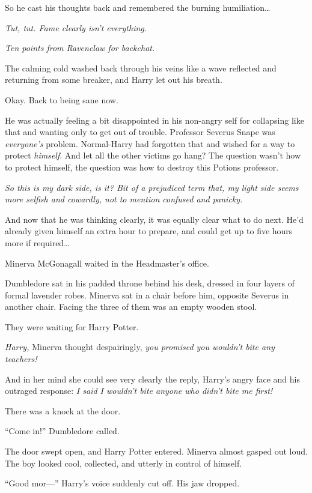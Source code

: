 So he cast his thoughts back and remembered the burning humiliation…

\emph{Tut, tut. Fame clearly isn’t everything.}

\emph{Ten points from Ravenclaw for backchat.}

The calming cold washed back through his veins like a wave reflected and returning from some breaker, and Harry let out his breath.

Okay. Back to being sane now.

He was actually feeling a bit disappointed in his non-angry self for collapsing like that and wanting only to get out of trouble. Professor Severus Snape was \emph{everyone’s} problem. Normal-Harry had forgotten that and wished for a way to protect \emph{himself}. And let all the other victims go hang? The question wasn’t how to protect himself, the question was how to destroy this Potions professor.

\emph{So this is my dark side, is it? Bit of a prejudiced term that, my light side seems more selfish and cowardly, not to mention confused and panicky.}

And now that he was thinking clearly, it was equally clear what to do next. He’d already given himself an extra hour to prepare, and could get up to five hours more if required…

\later

Minerva McGonagall waited in the Headmaster’s office.

Dumbledore sat in his padded throne behind his desk, dressed in four layers of formal lavender robes. Minerva sat in a chair before him, opposite Severus in another chair. Facing the three of them was an empty wooden stool.

They were waiting for Harry Potter.

\emph{Harry,} Minerva thought despairingly, \emph{you promised you wouldn’t bite any teachers!}

And in her mind she could see very clearly the reply, Harry’s angry face and his outraged response: \emph{I said I wouldn’t bite anyone who didn’t bite me first!}

There was a knock at the door.

“Come in!” Dumbledore called.

The door swept open, and Harry Potter entered. Minerva almost gasped out loud. The boy looked cool, collected, and utterly in control of himself.

“Good mor—” Harry’s voice suddenly cut off. His jaw dropped.

